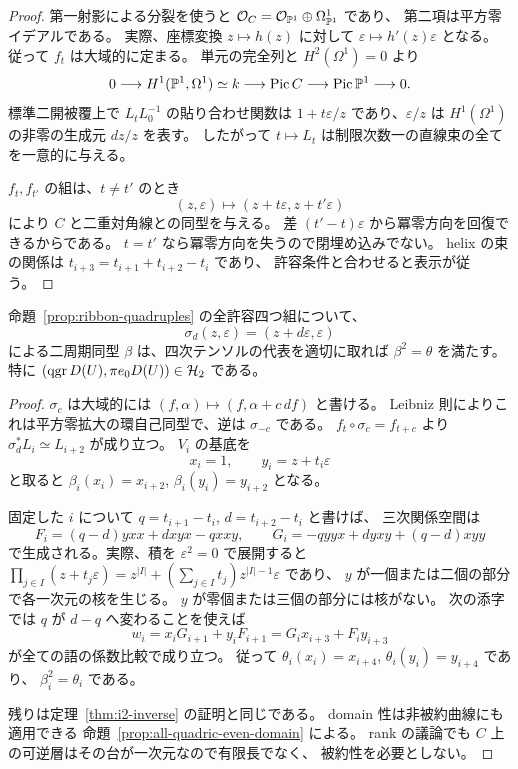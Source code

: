\begin{proof}
第一射影による分裂を使うと
$\mathcal O_C=\mathcal O_{\mathbb P^1}\oplus\Omega^1_{\mathbb P^1}$ であり、
第二項は平方零イデアルである。
実際、座標変換 $z\mapsto h(z)$ に対して
$\varepsilon\mapsto h'(z)\varepsilon$ となる。
従って $f_t$ は大域的に定まる。
単元の完全列と $H^2(\Omega^1)=0$ より
\[
 0\longrightarrow H^1(\mathbb P^1,\Omega^1)\simeq k
 \longrightarrow\operatorname{Pic} C\longrightarrow\operatorname{Pic}\mathbb P^1\longrightarrow0.
\]
標準二開被覆上で $L_tL_0^{-1}$ の貼り合わせ関数は
$1+t\varepsilon/z$ であり、$\varepsilon/z$ は
$H^1(\Omega^1)$ の非零の生成元 $dz/z$ を表す。
したがって $t\mapsto L_t$ は制限次数一の直線束の全てを一意的に与える。

$f_t,f_{t'}$ の組は、$t\ne t'$ のとき
\[
 (z,\varepsilon)\longmapsto
 (z+t\varepsilon,z+t'\varepsilon)
\]
により $C$ と二重対角線との同型を与える。
差 $(t'-t)\varepsilon$ から冪零方向を回復できるからである。
$t=t'$ なら冪零方向を失うので閉埋め込みでない。
helix の束の関係は $t_{i+3}=t_{i+1}+t_{i+2}-t_i$ であり、
許容条件と合わせると表示が従う。
\end{proof}

\begin{proposition}[二重対角線での平方根]
\label{prop:ribbon-period-square}
命題~\ref{prop:ribbon-quadruples} の全許容四つ組について、
\[
 \sigma_d(z,\varepsilon)=(z+d\varepsilon,\varepsilon)
\]
による二周期同型 $\beta$ は、四次テンソルの代表を適切に取れば
$\beta^2=\theta$ を満たす。特に
$(\operatorname{qgr} D(U),\pi e_0D(U))\in\mathcal H_2$ である。
\end{proposition}

\begin{proof}
$\sigma_c$ は大域的には
$(f,\alpha)\mapsto(f,\alpha+c\,df)$ と書ける。
Leibniz 則によりこれは平方零拡大の環自己同型で、逆は $\sigma_{-c}$ である。
$f_t\circ\sigma_c=f_{t+c}$ より
$\sigma_d^*L_i\simeq L_{i+2}$ が成り立つ。
$V_i$ の基底を
\[
 x_i=1,\qquad y_i=z+t_i\varepsilon
\]
と取ると $\beta_i(x_i)=x_{i+2}$, $\beta_i(y_i)=y_{i+2}$ となる。

固定した $i$ について $q=t_{i+1}-t_i$, $d=t_{i+2}-t_i$ と書けば、
三次関係空間は
\[
 F_i=(q-d)yxx+dxyx-qxxy,\qquad
 G_i=-qyyx+dyxy+(q-d)xyy
\]
で生成される。実際、積を $\varepsilon^2=0$ で展開すると
$\prod_{j\in I}(z+t_j\varepsilon)
=z^{|I|}+(\sum_{j\in I}t_j)z^{|I|-1}\varepsilon$ であり、
$y$ が一個または二個の部分で各一次元の核を生じる。
$y$ が零個または三個の部分には核がない。
次の添字では $q$ が $d-q$ へ変わることを使えば
\[
 w_i=x_iG_{i+1}+y_iF_{i+1}
    =G_ix_{i+3}+F_iy_{i+3}
\]
が全ての語の係数比較で成り立つ。
従って $\theta_i(x_i)=x_{i+4}$, $\theta_i(y_i)=y_{i+4}$ であり、
$\beta_i^2=\theta_i$ である。

残りは定理~\ref{thm:i2-inverse} の証明と同じである。
domain 性は非被約曲線にも適用できる
命題~\ref{prop:all-quadric-even-domain} による。
rank の議論でも $C$ 上の可逆層はその台が一次元なので有限長でなく、
被約性を必要としない。
\end{proof}

